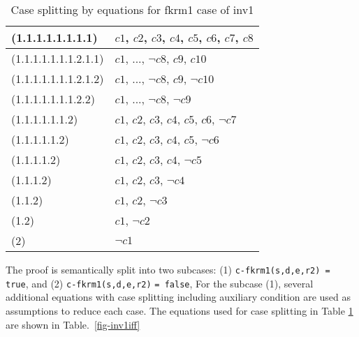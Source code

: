 \documentclass[a4paper,fleqn]{cas-dc}
\begin{document}
\begin{table}[]
	\begin{tabular}{l|l}
		\hline
		(1.1.1.1.1.1.1.1)   & $c1$, $c2$, $c3$, $c4$, $c5$, $c6$, $c7$, $c8$                                                    
		\\ \hline
		(1.1.1.1.1.1.1.2.1.1)         & $c1$, ..., $\neg c8$, $c9$, $c10$                                                       \\ \hline
		(1.1.1.1.1.1.1.2.1.2)         & $c1$, ..., $\neg c8$, $c9$, $\neg c10$                                                       \\ \hline
		(1.1.1.1.1.1.1.2.2) & $c1$, ..., $\neg c8$, $\neg c9$
		\\ \hline
		(1.1.1.1.1.1.2) & $c1$, $c2$, $c3$, $c4$, $c5$, $c6$, $\neg c7$ \\ \hline
		(1.1.1.1.1.2)   & $c1$, $c2$, $c3$, $c4$, $c5$, $\neg c6$              \\ \hline
		(1.1.1.1.2)     & $c1$, $c2$, $c3$, $c4$, $\neg c5$                           \\ \hline
		(1.1.1.2)       & $c1$, $c2$, $c3$, $\neg c4$                                        \\ \hline
		(1.1.2)       & $c1$, $c2$, $\neg c3$                                        \\ \hline
		
	    (1.2)       & $c1$, $\neg c2$                                        \\ \hline
	    (2)       & $\neg c1$                                        \\ \hline
	\end{tabular}
\caption{Case splitting by equations for fkrm1 case of inv1}
\label{fig-cs-inv1iff}
\end{table}
The proof is semantically split into two subcases: (1)  \verb!c-fkrm1(s,d,e,r2) = true!,
and (2) \verb!c-fkrm1(s,d,e,r2)! \verb!= false!,
For the subcase (1), several additional equations with case splitting including auxiliary condition are used as assumptions to reduce each case.
The equations used for case splitting in Table \ref{fig-cs-inv1iff} are shown in Table.~\ref{fig-inv1iff}
\noindent
\end{document}
